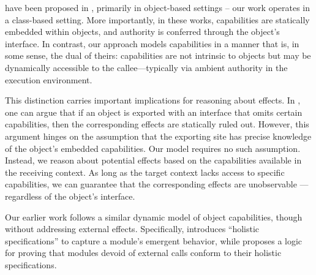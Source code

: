 
 {%
have been proposed in
 \cite{BirkedalL:caps-mmio-conf,ddd,vmsl-pldi2023,irisWasm23},   
 {primarily in object-based settings -- our work operates in a class-based setting.}
 More importantly, in these  works,  capabilities are statically embedded within objects, and authority is conferred through the object’s interface. In contrast, our approach models capabilities in a manner that is, in some sense, the dual of theirs: capabilities are not intrinsic to objects but may be 
 {dynamically accessible to the callee—typically via ambient authority in the execution environment.}}
 
 {This distinction carries important implications for reasoning  about   effects. 
 In  \cite{BirkedalL:caps-mmio-conf,ddd,vmsl-pldi2023,irisWasm23}, one can argue that if an object is exported with an interface that omits certain capabilities, then the corresponding effects are statically ruled out. 
 However, this argument hinges on the assumption that the exporting site has precise knowledge of the object’s embedded capabilities.
 Our model requires no such assumption. Instead, we reason about potential effects based on the capabilities available in the receiving context. %
{As long as the target context lacks access to specific capabilities}, we can guarantee that the corresponding effects are unobservable —regardless of the object’s interface.
 }

 

{Our earlier work} %
{\cite{FASE,OOPSLA22}   follows a
similar dynamic model of object capabilities, though without addressing external effects.}
Specifically, \cite{FASE}  introduces “holistic specifications” to capture a module’s emergent behavior, while
\cite{OOPSLA22}  proposes
a logic for proving that modules devoid of external calls conform to their holistic specifications.


